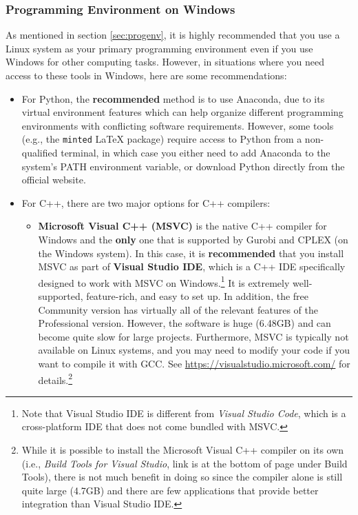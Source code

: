 \documentclass[12pt]{article}
\begin{document}
\subsubsection{Programming Environment on Windows}
As mentioned in section \ref{sec:progenv}, it is highly recommended that you use a Linux system as your primary programming environment even if you use Windows for other computing tasks. However, in situations where you need access to these tools in Windows, here are some recommendations:

\begin{itemize}
    \item For Python, the \textbf{recommended} method is to use Anaconda, due to its virtual environment features which can help organize different programming environments with conflicting software requirements. However, some tools (e.g., the \texttt{minted} LaTeX package) require access to Python from a non-qualified terminal, in which case you either need to add Anaconda to the system's PATH environment variable, or download Python directly from the official website.
    \item For C++, there are two major options for C++ compilers:
        \begin{itemize}
            \item \textbf{Microsoft Visual C++ (MSVC)} is the native C++ compiler for Windows and the \textbf{only} one that is supported by Gurobi and CPLEX (on the Windows system). In this case, it is \textbf{recommended} that you install MSVC as part of \textbf{Visual Studio IDE}, which is a C++ IDE specifically designed to work with MSVC on Windows.\footnote{Note that Visual Studio IDE is different from \emph{Visual Studio Code}, which is a cross-platform IDE that does not come bundled with MSVC.} It is extremely well-supported, feature-rich, and easy to set up. In addition, the free Community version has virtually all of the relevant features of the Professional version. However, the software is huge (6.48GB) and can become quite slow for large projects. Furthermore, MSVC is typically not available on Linux systems, and you may need to modify your code if you want to compile it with GCC. See \url{https://visualstudio.microsoft.com/} for details.\footnote{While it is possible to install the Microsoft Visual C++ compiler on its own (i.e., \emph{Build Tools for Visual Studio}, link is at the bottom of page under Build Tools), there is not much benefit in doing so since the compiler alone is still quite large (4.7GB) and there are few applications that provide better integration than Visual Studio IDE.}

\end{itemize}
\end{itemize}
\end{document}
